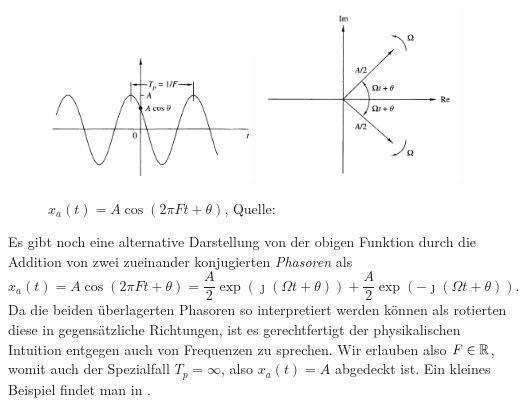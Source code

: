 \begin{figure}[t]
    \begin{center}
        \includegraphics[width=0.48\textwidth]{img/sampling/analog_cosine.png}
        \includegraphics[width=0.48\textwidth]{img/sampling/two_phasors.png}
    \end{center}
    \caption{$x_a(t) = A \cos(2 \pi F t + \theta)$, Quelle: \cite{proakis2013}}\label{fig:analog_cosine}
\end{figure}
%
Es gibt noch eine alternative Darstellung von der obigen Funktion durch die Addition von zwei zueinander konjugierten \emph{Phasoren} als
\[
    x_a(t) 
        = A \cos(2 \pi F t + \theta) 
        = \frac A2 \exp(\jmath (\Omega t + \theta)) 
            + \frac A2 \exp(- \jmath (\Omega t + \theta)).
\]
Da die beiden überlagerten Phasoren so interpretiert werden können als rotierten diese in gegensätzliche Richtungen, ist es gerechtfertigt der physikalischen Intuition entgegen auch von  Frequenzen zu sprechen.
Wir erlauben also $F \in \mathbb{R}$, womit auch der Spezialfall $T_p = \infty$, also $x_a(t) = A$ abgedeckt ist.
Ein kleines Beispiel findet man in .
%
